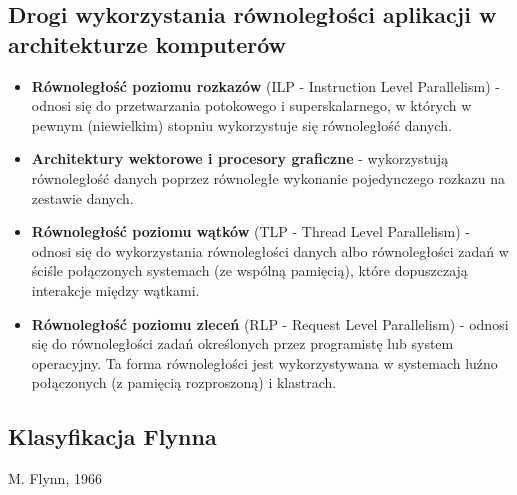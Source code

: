 	\subsection{Drogi wykorzystania równoległości aplikacji w architekturze komputerów}
		\begin{itemize}
			\item \textbf{Równoległość poziomu rozkazów} (ILP - Instruction Level Parallelism) - odnosi się do przetwarzania potokowego i superskalarnego, w których w pewnym (niewielkim) stopniu wykorzystuje się równoległość danych.
			\item \textbf{Architektury wektorowe i procesory graficzne} - wykorzystują równoległość danych poprzez równoległe wykonanie pojedynczego rozkazu na zestawie danych.
			\item \textbf{Równoległość poziomu wątków} (TLP - Thread Level Parallelism) - odnosi się do wykorzystania równoległości danych albo równoległości zadań w ściśle połączonych systemach (ze wspólną pamięcią), które dopuszczają interakcje między wątkami.
			\item \textbf{Równoległość poziomu zleceń} (RLP - Request Level Parallelism) - odnosi się do równoległości zadań określonych przez programistę lub system operacyjny. Ta forma równoległości jest wykorzystywana w systemach luźno połączonych (z pamięcią rozproszoną) i klastrach.
		\end{itemize}
	
	\newpage
	\subsection{Klasyfikacja Flynna}
		M. Flynn, 1966
